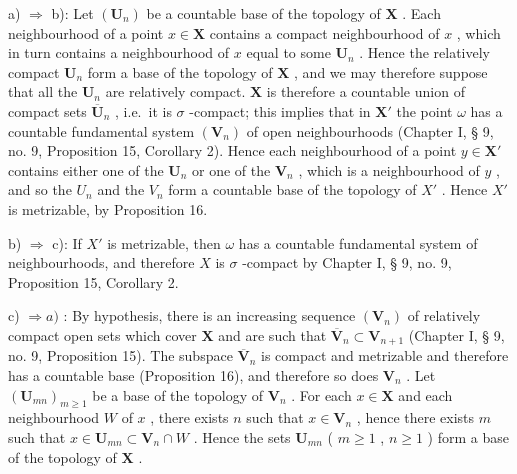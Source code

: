 a) \(\Longrightarrow\) b): Let \((\mathbf{U}_n)\) be a countable base of the topology of \(\mathbf{X}\) . Each neighbourhood of a point \(x \in \mathbf{X}\) contains a compact neighbourhood of \(x\) , which in turn contains a neighbourhood of \(x\) equal to some \(\mathbf{U}_n\) . Hence the relatively compact \(\mathbf{U}_n\) form a base of the topology of \(\mathbf{X}\) , and we may therefore suppose that all the \(\mathbf{U}_n\) are relatively compact. \(\mathbf{X}\) is therefore a countable union of compact sets \(\overline{\mathbf{U}}_n\) , i.e.~it is \(\sigma\) -compact; this implies that in \(\mathbf{X}'\) the point \(\omega\) has a countable fundamental system \((\mathbf{V}_n)\) of open neighbourhoods (Chapter I, § 9, no. 9, Proposition 15, Corollary 2). Hence each neighbourhood of a point \(y \in \mathbf{X}'\) contains either one of the \(\mathbf{U}_n\) or one of the \(\mathbf{V}_n\) , which is a neighbourhood of \(y\) , and so the \(U_{n}\) and the \(V_{n}\) form a countable base of the topology of \(X'\) . Hence \(X'\) is metrizable, by Proposition 16.

b) \(\Longrightarrow\) c): If \(X'\) is metrizable, then \(\omega\) has a countable fundamental system of neighbourhoods, and therefore \(X\) is \(\sigma\) -compact by Chapter I, § 9, no. 9, Proposition 15, Corollary 2.

c) \(\Longrightarrow a)\) : By hypothesis, there is an increasing sequence \((\mathbf{V}_n)\) of relatively compact open sets which cover \(\mathbf{X}\) and are such that \(\overline{\mathbf{V}}_n \subset \mathbf{V}_{n+1}\) (Chapter I, § 9, no. 9, Proposition 15). The subspace \(\overline{\mathbf{V}}_n\) is compact and metrizable and therefore has a countable base (Proposition 16), and therefore so does \(\mathbf{V}_n\) . Let \((\mathbf{U}_{mn})_{m \geqslant 1}\) be a base of the topology of \(\mathbf{V}_n\) . For each \(x \in \mathbf{X}\) and each neighbourhood \(W\) of \(x\) , there exists \(n\) such that \(x \in \mathbf{V}_n\) , hence there exists \(m\) such that \(x \in \mathbf{U}_{mn} \subset \mathbf{V}_n \cap W\) . Hence the sets \(\mathbf{U}_{mn}\) ( \(m \geqslant 1\) , \(n \geqslant 1\) ) form a base of the topology of \(\mathbf{X}\) .
\relax{}
